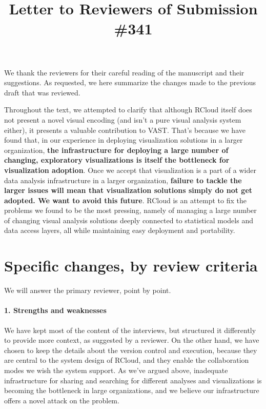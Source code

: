\documentclass{article}
\title{Letter to Reviewers of Submission \#341}
\begin{document}
\maketitle

We thank the reviewers for their careful reading of the manuscript and
their suggestions. As requested, we here summarize the changes
made to the previous draft that was reviewed.

Throughout the text, we attempted to clarify that although RCloud
itself does not present a novel visual encoding (and isn't a pure
visual analysis system either), it presents a valuable contribution
to VAST. That's because we have found that, in
our experience in deploying visualization solutions in a larger
organization, \textbf{the infrastructure for deploying a large number of
changing, exploratory visualizations is itself the bottleneck for
visualization adoption}. Once we accept that visualization is a part
of a wider data analysis infrastructure in a larger organization,
\textbf{failure to tackle the larger issues will mean that visualization
solutions simply do not get adopted. We want to avoid this future}.
RCloud is an attempt to fix the problems we found to be the most
pressing, namely of managing a large number of changing visual
analysis solutions deeply connected to statistical models and data
access layers, all while maintaining easy deployment and portability.

\section*{Specific changes, by review criteria}

We will answer the primary reviewer, point by point.

\paragraph*{1. Strengths and weaknesses}
We have kept most of the content of the interviews, but structured it
differently to provide more context, as suggested by a reviewer. On
the other hand, we have chosen to keep the details about the version
control and execution, because they are central to the system design
of RCloud, and they enable the collaboration modes we wish the system
support. As we've argued above, inadequate infrastructure for sharing
and searching for different analyses and visualizations is becoming
the bottleneck in large organizations, and we believe our
infrastructure offers a novel attack on the problem.
\end{document}
